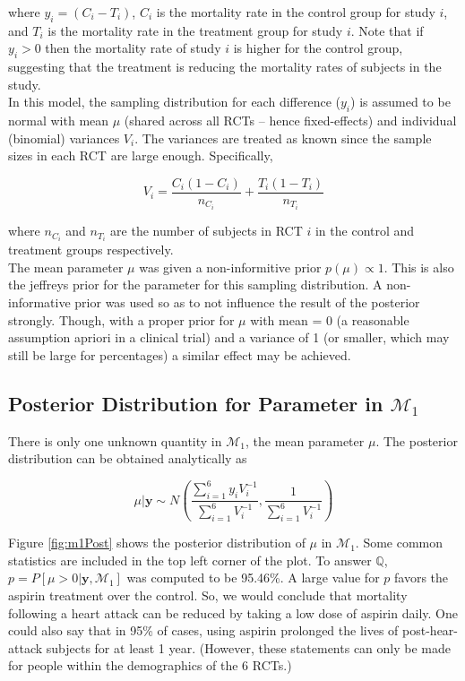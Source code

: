 \documentclass{../../tex_template/asaproc}
\newcommand{\p}[1]{\left(#1\right)}
\newcommand{\bk}[1]{\left[#1\right]}
\newcommand{\M}{\mathcal{M}}
\newcommand{\Q}{\mathbb{Q}}
\begin{document}
where $y_i = (C_i - T_i)$, $C_i$ is the mortality rate in the control group for
study $i$, and $T_i$ is the mortality rate in the treatment group for study
$i$. Note that if $y_i > 0$ then the mortality rate of study $i$ is higher
for the control group, suggesting that the treatment is reducing the
mortality rates of subjects in the study.\\

In this model, the sampling distribution for each difference ($y_i$) is assumed
to be normal with mean $\mu$ (shared across all RCTs -- hence fixed-effects)
and individual (binomial) variances $V_i$. The variances are treated as known
since the sample sizes in each RCT are large enough. Specifically,

$$
V_i = \frac{C_i(1-C_i)}{n_{C_i}} + \frac{T_i(1-T_i)}{n_{T_i}}
$$

where $n_{C_i}$ and $n_{T_i}$ are the number of subjects in RCT $i$ in the
control and treatment groups respectively.\\

The mean parameter $\mu$ was given a non-informitive prior $p(\mu) \propto 1$.
This is also the jeffreys prior for the parameter for this sampling
distribution. A non-informative prior was used so as to not influence the
result of the posterior strongly. Though, with a proper prior for $\mu$ with
mean = 0 (a reasonable assumption apriori in a clinical trial) and a variance
of 1 (or smaller, which may still be large for percentages) a similar effect may
be achieved.\\

\subsection{Posterior Distribution for Parameter in $\M_1$}
There is only one unknown quantity in $\M_1$, the mean parameter $\mu$. 
The posterior distribution can be obtained analytically as

$$
\mu | \bm{y} \sim N\p{\frac{\sum_{i=1}^6 y_iV_i^{-1}}{\sum_{i=1}^6V_i^{-1}},
                      \frac{1}{\sum_{i=1}^6V_i^{-1}}}
$$

Figure \ref{fig:m1Post} shows the posterior distribution of $\mu$ in $\M_1$.
Some common statistics are included in the top left corner of the plot. To
answer $\Q$, $p=P\bk{\mu>0|\bm{y},\M_1}$ was computed to be 95.46\%.  A large
value for $p$ favors the aspirin treatment over the control. So, we would
conclude that mortality following a heart attack can be reduced by taking a low
dose of aspirin daily. One could also say that in 95\% of cases, using aspirin
prolonged the lives of post-hear-attack subjects for at least 1 year. (However,
these statements can only be made for people within the demographics of the 6
RCTs.)
\end{document}
